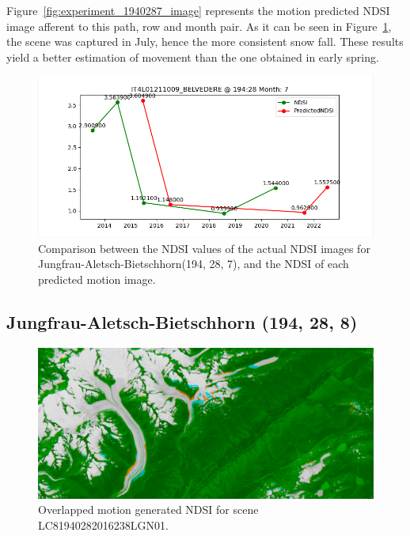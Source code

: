 \documentclass[12pt, a4paper]{report}
\begin{document}
	Figure~\ref{fig:experiment_1940287_image} represents the motion predicted NDSI image afferent to this path, row and month pair. As it can be seen in Figure~\ref{fig:jungfrau_194287}, the scene was captured in July, hence the more consistent snow fall. These results yield a better estimation of movement than the one obtained in early spring.
	
	\begin{figure}[h!]
		\centering
		\includegraphics[scale=0.5]{../images/experiment_194287.png}
		\caption{Comparison between the NDSI values of the actual NDSI images for Jungfrau-Aletsch-Bietschhorn(194, 28, 7), and the NDSI of each predicted motion image.}
		\label{fig:jungfrau_194287}
	\end{figure}

	
	\newpage{}
	
	\subsection{Jungfrau-Aletsch-Bietschhorn (194, 28, 8)}
	
	\begin{figure}[h!]
		\centering
		\includegraphics[width=\linewidth]{../images/experiment_1940288_image.png}
		\caption{Overlapped motion generated NDSI for scene LC81940282016238LGN01.}
		\label{fig:experiment_1940288_image}
	\end{figure}
\end{document}
